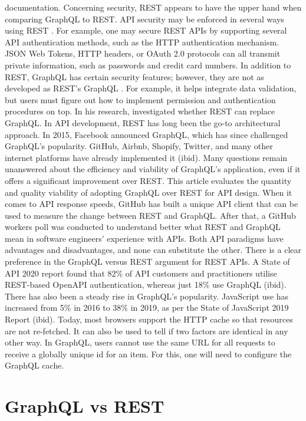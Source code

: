 documentation. Concerning security, REST appears to have the upper hand when
comparing GraphQL to REST. API security may be enforced in several ways using
REST \citep{vadlamaniCanGraphQLReplace2021}. For example, one may secure REST
APIs by supporting several API authentication methods, such as the HTTP
authentication mechanism. JSON Web Tokens, HTTP headers, or OAuth 2.0 protocols
can all transmit private information, such as passwords and credit card numbers.
In addition to REST, GraphQL has certain security features; however, they are
not as developed as REST's GraphQL \citep{lawiEvaluatingGraphQLREST2021}. For
example, it helps integrate data validation, but users must figure out how to
implement permission and authentication procedures on top. In his research,
\citet{vadlamaniCanGraphQLReplace2021} investigated whether REST can replace
GraphQL. In API development, REST has long been the go-to architectural approach.
In 2015, Facebook announced GraphQL, which has since challenged GraphQL's
popularity. GitHub, Airbnb, Shopify, Twitter, and many other internet platforms
have already implemented it (ibid). Many questions remain unanswered about the
efficiency and viability of GraphQL's application, even if it offers a
significant improvement over REST. This article evaluates the quantity and
quality viability of adopting GraphQL over REST for API design. When it comes to
API response speeds, GitHub has built a unique API client that can be used to
measure the change between REST and GraphQL. After that, a GitHub workers poll
was conducted to understand better what REST and GraphQL mean in software
engineers' experience with APIs. Both API paradigms have advantages and
disadvantages, and none can substitute the other. There is a clear preference in
the GraphQL versus REST argument for REST APIs. A State of API 2020 report found
that 82\% of API customers and practitioners utilise REST-based OpenAPI
authentication, whereas just 18\% use GraphQL (ibid). There has also been a
steady rise in GraphQL's popularity. JavaScript use has increased from 5\%
in 2016 to 38\% in 2019, as per the State of JavaScript 2019 Report
(ibid). Today, most browsers support the HTTP cache so that resources are not
re-fetched. It can also be used to tell if two factors are identical in any
other way. In GraphQL, users cannot use the same URL for all requests to receive
a globally unique id for an item. For this, one will need to configure the
GraphQL cache.

\section{GraphQL vs REST}
\label{s:GraphQLvsRest}

